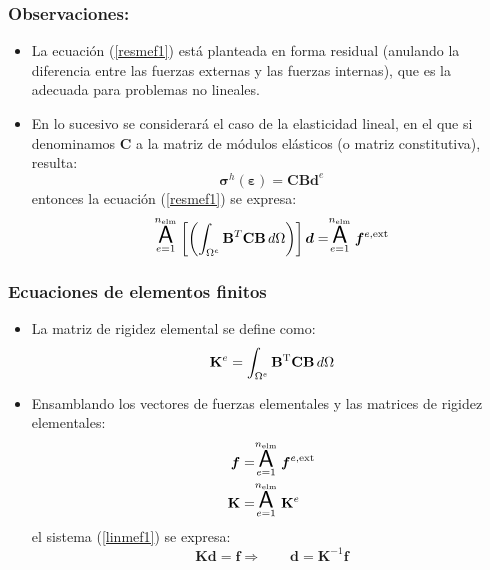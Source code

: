 \documentclass{beamer}
\begin{document}
\begin{frame}
\frametitle{Observaciones:}
\begin{itemize}
\item La ecuación (\ref{resmef1}) está planteada en forma
residual (anulando la diferencia entre las fuerzas externas y las fuerzas
internas), que es la adecuada para problemas no lineales.
\item En lo sucesivo se considerará el caso de la elasticidad lineal, en el
que si denominamos $\mathbf{C}$ a la matriz de módulos elásticos 
(o matriz constitutiva), resulta:
\begin{equation}
\bm{\sigma}^h(\bm{\varepsilon})=
\mathbf{C} \mathbf{B}\bm{d}^e
\end{equation}
entonces la ecuación (\ref{resmef1}) se expresa:
\begin{equation}
\stackrel{n_{\textrm{elm}}}{\underset{e=1}{\mbox{\LARGE{\bf {\sf A}}}}} \left[
\left(\int_{\Omega^e} \mathbf{B}^T \mathbf{C} \mathbf{B} \, d \Omega \right)
\right]\bm{d}=
\stackrel{n_{\textrm{elm}}}{\underset{e=1}{\mbox{\LARGE{\bf {\sf A}}}}}
\bm{f}^{e,\textrm{ext}} \label{linmef1}
\end{equation}
\end{itemize}
\end{frame}
\begin{frame}
\frametitle{Ecuaciones de elementos finitos}
\begin{itemize}
\item La matriz de rigidez elemental se define como:
\begin{equation}
\mathbf{K}^{e}=
\int_{\Omega^{e}} \mathbf{B}^{\rm T}  \mathbf{C}
\mathbf{B} \, d \Omega \label{arrc}
\end{equation}
\item Ensamblando los vectores de fuerzas elementales y las matrices de
rigidez elementales:
\begin{align}
\bm{f}&=\stackrel{n_{\textrm{elm}}}{\underset{e=1}{\mbox{\LARGE{\bf {\sf A}}}}}
\bm{f}^{e,\textrm{ext}} \\
\mathbf{K}&=\stackrel{n_{\textrm{elm}}}{\underset{e=1}{\mbox{\LARGE{\bf {\sf A}}}}} \mathbf{K}^{e}
\end{align}
el sistema (\ref{linmef1}) se expresa:
\begin{equation}
\mathbf{K} \bm{d}=\bm{f} \Rightarrow \qquad \bm{d}=\mathbf{K}^{-1} \bm{f}
\end{equation}
\end{itemize}
\end{frame}
\end{document}
